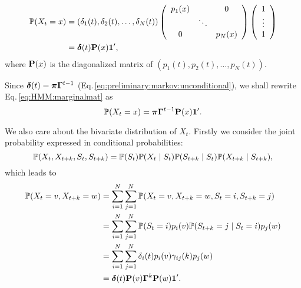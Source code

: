		\begin{equation}
		\label{eq:HMM:marginalmat}
		\begin{aligned}
		\mathbb{P}(X_t = x) & = (\delta_1(t),\delta_2(t),\dots,\delta_N(t)) 
			\left ( \begin{array} {c c c}
				p_1(x) & & 0 \\
				& \ddots & \\
				0 & & p_N(x) \\
			\end{array} \right)
			\left ( \begin{array} {c}
				1 \\	\vdots \\	1 \\
			\end{array} \right) \\
		& = {\boldsymbol\delta}(t){\mathbf P}(x){\mathbf{1}^{\prime}},
        \end{aligned}
        \end{equation}
where ${\mathbf P}(x)$ is the diagonalized matrix of $(p_1(t),p_2(t),\dots,p_N(t))$.

Since ${\boldsymbol\delta}(t) = {\boldsymbol\pi}{\boldsymbol\Gamma}^{t-1}$ (Eq.\,\ref{eq:preliminary:markov:unconditional}), 
we shall rewrite Eq.\,\ref{eq:HMM:marginalmat} as 
		\begin{equation}
		\label{eq:HMM:marginalmatsimple}
		\mathbb{P}(X_t = x) = {\boldsymbol\pi}{\boldsymbol\Gamma}^{t-1}{\mathbf P}(x){\mathbf{1}^{\prime}}.
        \end{equation}

We also care about the bivariate distribution of $X_t$.
Firstly we consider the joint probability expressed in conditional probabilities:
		\begin{equation}
		\label{eq:HMM:joint}
		\mathbb{P}(X_t,X_{t+k},S_t,S_{t+k}) = 
			\mathbb{P}(S_t)\mathbb{P}(X_t \mid S_t)\mathbb{P}(S_{t+k} \mid S_t)\mathbb{P}(X_{t+k} \mid S_{t+k}),
        \end{equation}
which leads to
		\begin{equation}
		\label{eq:HMM:bivariate}
		\begin{aligned}
		\mathbb{P}(X_t = v,X_{t+k} = w) & = 
			\sum_{i=1}^{N}\sum_{j=1}^{N} \mathbb{P}(X_t = v,X_{t+k} = w,S_t = i,S_{t+k} = j) \\
		& = \sum_{i=1}^{N}\sum_{j=1}^{N} 
			\mathbb{P}(S_t = i)p_i(v)\mathbb{P}(S_{t+k} = j \mid S_t = i)p_j(w) \\
		& = \sum_{i=1}^{N}\sum_{j=1}^{N} \delta_i(t)p_i(v)\gamma_{ij}(k)p_j(w) \\
		& = {\boldsymbol\delta}(t){\mathbf P}(v){\boldsymbol\Gamma}^k{\mathbf P}(w){\mathbf{1}^{\prime}}.
        \end{aligned}
        \end{equation}

